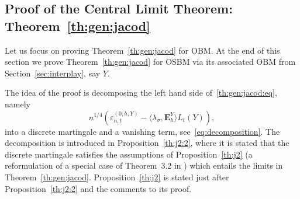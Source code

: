 \documentclass[12pt]{article}
\numberwithin{equation}{section}
\theoremstyle{definition}
\theoremstyle{remark}
\newcommand{\bfH}[1]{\mathbf{E}^Y_{#1}}
\begin{document}
\subsection{Proof of the Central Limit Theorem: Theorem~\ref{th:gen:jacod}}
 \label{sec:proof:summary}


Let us focus on proving Theorem~\ref{th:gen:jacod} for OBM. At the end of this section we prove Theorem~\ref{th:gen:jacod} for OSBM via its associated OBM from Section~\ref{sec:interplay}, say $Y$.

The idea of the proof is decomposing the left hand side of~\eqref{th:gen:jacod:eq}, namely 
\[n^{1/4}\left( \varepsilon_{n,t}^{(0,h,Y)} - \langle \lambda_\sigma , \bfH h \rangle L_t(Y)\right),\] 
into a discrete martingale and a vanishing term, see~\eqref{eq:decomposition}.
%
The decomposition is introduced in Proposition~\ref{th:j2:2}, where it is stated that the discrete martingale satisfies the assumptions of Proposition~\ref{th:j2} (a reformulation of a special case of Theorem~3.2 in \cite{j2}) which entails the limits in Theorem~\ref{th:gen:jacod}.
Proposition~\ref{th:j2} is stated just after Proposition~\ref{th:j2:2} and the comments to its proof.
\end{document}
